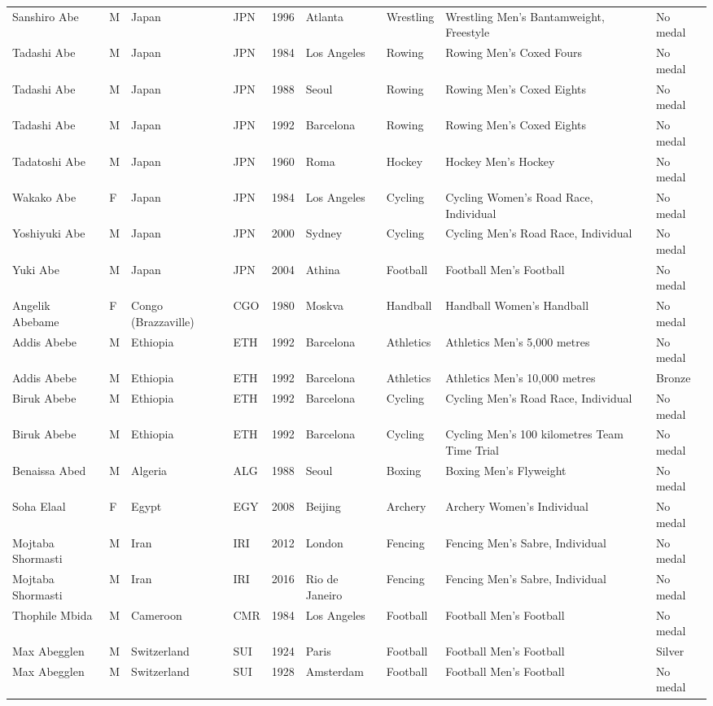 \documentclass{article}%
\begin{document}
\begin{longtable}{p{1.5cm} p{0.5cm} p{2cm} p{1cm} p{1cm} p{1.5cm} p{1.5cm} p{5cm} p{1.5cm}}
Sanshiro Abe&M&Japan&JPN&1996&Atlanta&Wrestling&Wrestling Men's Bantamweight, Freestyle&No medal\\%
Tadashi Abe&M&Japan&JPN&1984&Los Angeles&Rowing&Rowing Men's Coxed Fours&No medal\\%
Tadashi Abe&M&Japan&JPN&1988&Seoul&Rowing&Rowing Men's Coxed Eights&No medal\\%
Tadashi Abe&M&Japan&JPN&1992&Barcelona&Rowing&Rowing Men's Coxed Eights&No medal\\%
Tadatoshi Abe&M&Japan&JPN&1960&Roma&Hockey&Hockey Men's Hockey&No medal\\%
Wakako Abe&F&Japan&JPN&1984&Los Angeles&Cycling&Cycling Women's Road Race, Individual&No medal\\%
Yoshiyuki Abe&M&Japan&JPN&2000&Sydney&Cycling&Cycling Men's Road Race, Individual&No medal\\%
Yuki Abe&M&Japan&JPN&2004&Athina&Football&Football Men's Football&No medal\\%
Angelik Abebame&F&Congo (Brazzaville)&CGO&1980&Moskva&Handball&Handball Women's Handball&No medal\\%
Addis Abebe&M&Ethiopia&ETH&1992&Barcelona&Athletics&Athletics Men's 5,000 metres&No medal\\%
Addis Abebe&M&Ethiopia&ETH&1992&Barcelona&Athletics&Athletics Men's 10,000 metres&Bronze\\%
Biruk Abebe&M&Ethiopia&ETH&1992&Barcelona&Cycling&Cycling Men's Road Race, Individual&No medal\\%
Biruk Abebe&M&Ethiopia&ETH&1992&Barcelona&Cycling&Cycling Men's 100 kilometres Team Time Trial&No medal\\%
Benaissa Abed&M&Algeria&ALG&1988&Seoul&Boxing&Boxing Men's Flyweight&No medal\\%
Soha Elaal&F&Egypt&EGY&2008&Beijing&Archery&Archery Women's Individual&No medal\\%
Mojtaba Shormasti&M&Iran&IRI&2012&London&Fencing&Fencing Men's Sabre, Individual&No medal\\%
Mojtaba Shormasti&M&Iran&IRI&2016&Rio de Janeiro&Fencing&Fencing Men's Sabre, Individual&No medal\\%
Thophile Mbida&M&Cameroon&CMR&1984&Los Angeles&Football&Football Men's Football&No medal\\%
Max Abegglen&M&Switzerland&SUI&1924&Paris&Football&Football Men's Football&Silver\\%
Max Abegglen&M&Switzerland&SUI&1928&Amsterdam&Football&Football Men's Football&No medal\\%

\end{longtable}
\end{document}
